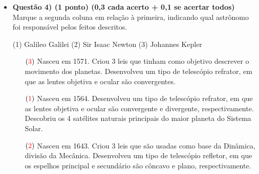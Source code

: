 \documentclass[a4paper, 12pt]{article}
\newcommand{\red}[1]{\textcolor{red}{#1}}
\begin{document}
\begin{flushleft}
\begin{itemize}
		\newpage
		\item \textbf{Questão 4) (1 ponto) (0,3 cada acerto + 0,1 se acertar todos)} Marque a segunda coluna em relação à primeira, indicando qual astrônomo foi responsável pelos feitos descritos.
			\begin{multicols}{2}
				\vfill\null \vfill\null
				\begin{flushleft}
					(1) Galileo Galilei \linebreak
					(2) Sir Isaac Newton \linebreak
					(3) Johannes Kepler
				\end{flushleft}
				\vfill\null \vfill\null
				\columnbreak
				\begin{itemize}
					\item[$(\red{3})$] Nasceu em 1571. Criou 3 leis que tinham como objetivo descrever o movimento dos planetas. Desenvolveu um tipo de telescópio refrator, em que as lentes objetiva e ocular são convergentes.
					\item[$(\red{1})$] Nasceu em 1564. Desenvolveu um tipo de telescópio refrator, em que as lentes objetiva e ocular são convergente e divergente, respectivamente. Descobriu os 4 satélites naturais principais do maior planeta do Sistema Solar.
					\item[$(\red{2})$] Nasceu em 1643. Criou 3 leis que são usadas como base da Dinâmica, divisão da Mecânica. Desenvolveu um tipo de telescópio refletor, em que os espelhos principal e secundário são côncavo e plano, respectivamente.
				\end{itemize}
			\end{multicols}
				

\end{itemize}
\end{flushleft}
\end{document}
